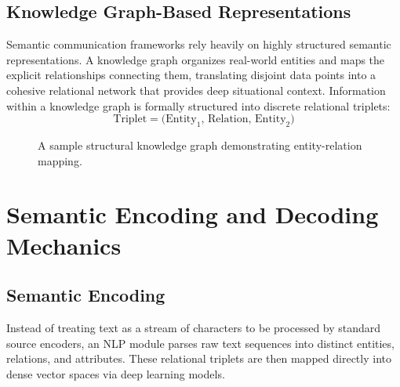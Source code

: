 \documentclass[10pt, conference]{IEEEtran}
\begin{document}
\subsection{\textbf{Knowledge Graph-Based Representations}}
Semantic communication frameworks rely heavily on highly structured semantic representations. A knowledge graph organizes real-world entities and maps the explicit relationships connecting them, translating disjoint data points into a cohesive relational network that provides deep situational context. Information within a knowledge graph is formally structured into discrete relational triplets:
\begin{equation}
    \text{Triplet} = \big(\text{Entity}_1, \, \text{Relation}, \, \text{Entity}_2\big)
\end{equation}

\begin{figure}[h]
\centering
{}
\caption{A sample structural knowledge graph demonstrating entity-relation mapping.}
\label{fig:knowledge_graph}
\end{figure}

\section{\large \textbf{Semantic Encoding and Decoding Mechanics}}

\subsection{\textbf{Semantic Encoding}}
Instead of treating text as a stream of characters to be processed by standard source encoders, an NLP module parses raw text sequences into distinct entities, relations, and attributes. These relational triplets are then mapped directly into dense vector spaces via deep learning models. 
\end{document}
